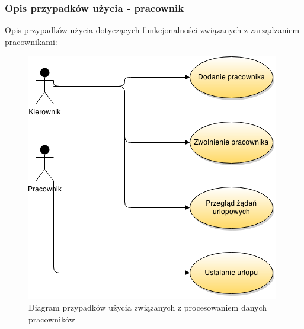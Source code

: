 \subsubsection{Opis przypadków użycia - pracownik}

Opis przypadków użycia dotyczących funkcjonalności związanych z zarządzaniem
pracownikami:

\begin{figure}[h!]
    \includegraphics[width=\textwidth,
    height=0.5\textheight]{graphics/UseCase/Pracownik/UseCaseDiagram.png}
  \caption{Diagram przypadków użycia związanych z procesowaniem danych
  pracowników}
\end{figure}

